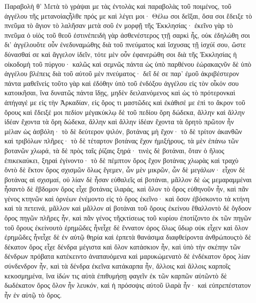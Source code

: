 Παραβολὴ θ’
Μετὰ τὸ γράψαι με τὰς ἐντολὰς καὶ παραβολὰς τοῦ ποιμένος, τοῦ ἀγγέλου τῆς μετανοίαςἦλθε πρός με καὶ λέγει μοι· Θέλω σοι δεῖξαι, ὅσα σοι ἔδειξε τὸ πνεῦμα τὸ ἅγιον τὸ λαλῆσαν μετὰ σοῦ ἐν μορφῇ τῆς Ἐκκλησίας· ἐκεῖνο γὰρ τὸ πνεῦμα ὁ υἱὸς τοῦ θεοῦ ἐστινἐπειδὴ γὰρ ἀσθενέστερος τͅτῇ σαρκὶ ἦς, οὐκ ἐδηλώθη σοι δι’ ἀγγέλουὅτε οὖν ἐνεδυναμώθης διὰ τοῦ πνεύματος καὶ ἴσχυσας τῇ ἰσχύϊ σου, ὥστε δύνασθαί σε καὶ ἄγγελον ἰδεῖν, τότε μὲν οὖν ἐφανερώθη σοι διὰ τῆς Ἐκκλησίας ἡ οἰκοδομὴ τοῦ πύργου· καλῶς καὶ σεμνῶς πάντα ὡς ὑπὸ παρθένου ἑώρακαςνῦν δὲ ὑπὸ ἀγγέλου βλέπεις διὰ τοῦ αὐτοῦ μὲν πνεύματος· δεῖ δέ σε παρ’ ἐμοῦ ἀκριβέστερον πάντα μαθεῖνεἰς τοῦτο γὰρ καὶ ἐδόθην ὑπὸ τοῦ ἐνδόξου ἀγγέλου εἰς τὸν οἶκόν σου κατοικῆσαι, ἵνα δυνατῶς πάντα ἴδῃς, μηδὲν δειλαινόμενος καὶ ὡς τὸ πρότερονκαὶ ἀπήγαγέ με εἰς τὴν Ἀρκαδίαν, εἰς ὄρος τι μαστῶδες καὶ ἐκάθισέ με ἐπὶ το ἄκρον τοῦ ὄρους καὶ ἔδειξέ μοι πεδίον μέγακύκλῳ δὲ τοῦ πεδίου ὄρη δώδεκα, ἄλλην καὶ ἄλλην ἰδέαν ἔχοντα τὰ ὄρη δώδεκα, ἄλλην καὶ ἄλλην ἰδέαν ἔχοντα τὰ ὄρητὸ πρῶτον ἦν μέλαν ὡς ἀσβόλη· τὸ δὲ δεύτερον ψιλόν, βοτάνας μὴ ἔχον· τὸ δὲ τρίτον ἀκανθῶν καὶ τριβόλων πλῆρες· τὸ δὲ τέταρτον βοτάνας ἔχον ἡμιξήρους, τὰ μὲν ἐπάνω τῶν βοτανῶν χλωρά, τὰ δὲ πρὸς ταῖς ῥίζαις ξηρά· τινὲς δὲ βοτάναι, ὅταν ὁ ἥλιος ἐπικεκαύκει, ξηραὶ ἐγίνοντο· τὸ δὲ πέμπτον ὅρος ἔχον βοτάνας χλωρὰς καὶ τραχὺ ὄντὸ δὲ ἕκτον ὄρος σχισμῶν ὅλως ἔγεμεν, ὧν μὲν μικρῶν, ὧν δὲ μεγάλων· εἶχον δὲ βοτάνας αἱ σχισμαί, οὐ λίαν δὲ ἦσαν εὐθαλεῖς αἱ βοτάναι, μᾶλλον δὲ ὡς μεμαραμμέναι ἦσαντὸ δὲ ἕβδομον ὄρος εἶχε βοτάνας ἱλαράς, καὶ ὅλον τὸ ὄρος εὐθηνοῦν ἦν, καὶ πᾶν γένος κτηνῶν καὶ ὀρνέων ἐνέμοντο εἰς τὸ ὄρος ἐκεῖνο· καὶ ὅσον ἐβόσκοντο τὰ κτήνη καὶ τὰ πετεινά, μᾶλλον καὶ μᾶλλον αἱ βοτάναι τοῦ ὄρους ἐκείνου ἔθαλλοντὸ δὲ ὄγδοον ὄρος πηγῶν πλῆρες ἦν, καὶ πᾶν γένος τῆςκτίσεως τοῦ κυρίου ἐποτίζοντο ἐκ τῶν πηγῶν τοῦ ὄρους ἐκείνουτὸ ἐρημῶδες ἦνεἶχε δὲ ἔννατον ὀρος ὅλως ὕδωρ οὐκ εἶχεν καὶ ὅλον ἐρημῶδες ἦνεἶχε δὲ ἐν αὐτῷ θηρία καὶ ἑρπετὰ θανάσιμα διαφθείροντα ἀνθρώπουςτὸ δὲ δέκατον ὄρος εἶχε δένδρα μέγιστα καὶ ὅλον κατάσκιον ἦν, καὶ ὑπὸ τὴν σκέπην τῶν δένδρων πρόβατα κατέκειντο ἀναπαυόμενα καὶ μαρυκώμενατὸ δὲ ἑνδέκατον ὄρος λίαν σύνδενδρον ἦν, καὶ τὰ δένδρα ἐκεῖνα κατάκαρπα ἦν, ἄλλοις καὶ ἄλλοις καρποῖς κεκοσμημένα, ἵνα ἰδών τις αὐτὰ ἐπιθυμήσῃ φαγεῖν ἐκ τῶν καρπῶν αὐτῶντὸ δὲ δωδέκατον ὄρος ὅλον ἦν λευκόν, καὶ ἡ πρόσοψις αὐτοῦ ἱλαρὰ ἦν· καὶ εὐπρεπέστατον ἦν ἐν αὑτῷ τὸ ὄρος.
